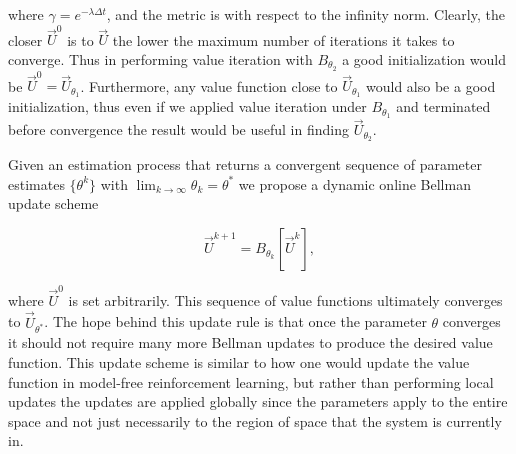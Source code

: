\documentclass{journal}
\begin{document}
\noindent where $\gamma= e^{-\lambda \Delta t}$, and the metric is with respect to the infinity norm. Clearly, the closer $\vec{U}^0$ is to $\vec{U}$ the lower the maximum number of iterations it takes to converge. Thus in performing value iteration with $B_{\theta_2}$ a good initialization would be $\vec{U}^0=\vec{U}_{\theta_1}$. Furthermore, any value function close to $\vec{U}_{\theta_1}$ would also be a good initialization, thus even if we applied value iteration under $B_{\theta_1}$ and terminated before convergence the result would be useful in finding $\vec{U}_{\theta_2}$.

Given an estimation process that returns a convergent sequence of parameter estimates $\{\theta^k\}$  with $\lim_{k \rightarrow \infty} \theta_k = \theta^*$ we propose a dynamic online Bellman update scheme 

\begin{equation} \label{eq:dyn_bell}
\vec{U}^{k+1}=B_{\theta_k}[\vec{U}^k],
\end{equation}

\noindent where $\vec{U}^{0}$ is set arbitrarily. This sequence of value functions ultimately converges to $\vec{U}_{\theta^*}$. The hope behind this update rule is that  once the parameter $\theta$ converges it should not require many more Bellman updates to produce the desired value function. This update scheme is similar to how one would update the value function in model-free reinforcement learning, but rather than performing local updates the updates are applied globally since the parameters apply to the entire space and not just necessarily to the region of space that the system is currently in.
\end{document}

